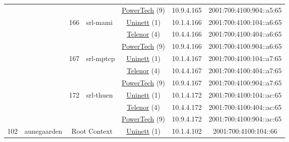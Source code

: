 \begin{small}
\begin{center}
\begin{longtable}{|c|c|c|c|c|c|c|c|}
  &  &  &  & \multicolumn{2}{|c|}{\tiny{\href{http://www.powertech.no}{PowerTech} (9)}} & \tiny{10.9.4.165} & \tiny{2001:700:4100:904::a5:65} \\* \cline{3-3}\cline{4-4}\cline{5-5}\cline{6-6}\cline{7-7}\cline{8-8}
  &  & \multirow{3}{*}{\tiny{166}} & \multicolumn{1}{|l|}{\multirow{3}{*}{\tiny{srl-mami}}} & \multicolumn{2}{|c|}{\tiny{\href{https://www.uninett.no}{Uninett} (1)}} & \tiny{10.1.4.166} & \tiny{2001:700:4100:104::a6:65} \\* \cline{5-5}\cline{6-6}\cline{7-7}\cline{8-8}
  &  &  &  & \multicolumn{2}{|c|}{\tiny{\href{https://www.telenor.no}{Telenor} (4)}} & \tiny{10.4.4.166} & \tiny{2001:700:4100:404::a6:65} \\* \cline{5-5}\cline{6-6}\cline{7-7}\cline{8-8}
  &  &  &  & \multicolumn{2}{|c|}{\tiny{\href{http://www.powertech.no}{PowerTech} (9)}} & \tiny{10.9.4.166} & \tiny{2001:700:4100:904::a6:65} \\* \cline{3-3}\cline{4-4}\cline{5-5}\cline{6-6}\cline{7-7}\cline{8-8}
  &  & \multirow{3}{*}{\tiny{167}} & \multicolumn{1}{|l|}{\multirow{3}{*}{\tiny{srl-mptcp}}} & \multicolumn{2}{|c|}{\tiny{\href{https://www.uninett.no}{Uninett} (1)}} & \tiny{10.1.4.167} & \tiny{2001:700:4100:104::a7:65} \\* \cline{5-5}\cline{6-6}\cline{7-7}\cline{8-8}
  &  &  &  & \multicolumn{2}{|c|}{\tiny{\href{https://www.telenor.no}{Telenor} (4)}} & \tiny{10.4.4.167} & \tiny{2001:700:4100:404::a7:65} \\* \cline{5-5}\cline{6-6}\cline{7-7}\cline{8-8}
  &  &  &  & \multicolumn{2}{|c|}{\tiny{\href{http://www.powertech.no}{PowerTech} (9)}} & \tiny{10.9.4.167} & \tiny{2001:700:4100:904::a7:65} \\* \cline{3-3}\cline{4-4}\cline{5-5}\cline{6-6}\cline{7-7}\cline{8-8}
  &  & \multirow{3}{*}{\tiny{172}} & \multicolumn{1}{|l|}{\multirow{3}{*}{\tiny{srl-thuen}}} & \multicolumn{2}{|c|}{\tiny{\href{https://www.uninett.no}{Uninett} (1)}} & \tiny{10.1.4.172} & \tiny{2001:700:4100:104::ac:65} \\* \cline{5-5}\cline{6-6}\cline{7-7}\cline{8-8}
  &  &  &  & \multicolumn{2}{|c|}{\tiny{\href{https://www.telenor.no}{Telenor} (4)}} & \tiny{10.4.4.172} & \tiny{2001:700:4100:404::ac:65} \\* \cline{5-5}\cline{6-6}\cline{7-7}\cline{8-8}
  &  &  &  & \multicolumn{2}{|c|}{\tiny{\href{http://www.powertech.no}{PowerTech} (9)}} & \tiny{10.9.4.172} & \tiny{2001:700:4100:904::ac:65} \\ \hline
 \multirow{51}{*}{\tiny{102}} & \multicolumn{1}{|l|}{\multirow{51}{*}{\tiny{aunegaarden}}} & \multicolumn{2}{|c|}{\multirow{3}{*}{\tiny{Root Context}}} & \multicolumn{2}{|c|}{\tiny{\href{https://www.uninett.no}{Uninett} (1)}} & \tiny{10.1.4.102} & \tiny{2001:700:4100:104::66} \\* \cline{5-5}\cline{6-6}\cline{7-7}\cline{8-8}

\end{longtable}
\end{center}
\end{small}
